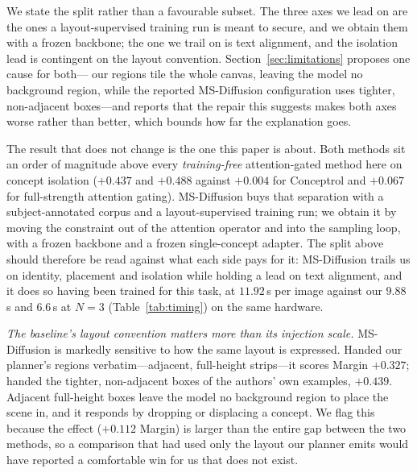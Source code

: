 \documentclass[10pt,twocolumn,letterpaper]{article}
\begin{document}
We state the split rather than a favourable subset.  The three axes we lead
on are the ones a layout-supervised training run is meant to secure, and we
obtain them with a frozen backbone; the one we trail on is text alignment,
and the isolation lead is contingent on the layout convention.
Section~\ref{sec:limitations} proposes one cause for both---
our regions tile the whole canvas, leaving the model no background region,
while the reported MS-Diffusion configuration uses tighter, non-adjacent
boxes---and reports that the repair this suggests makes both axes worse
rather than better, which bounds how far the explanation goes.

The result that does not change is the one this paper is about.  Both methods
sit an order of magnitude above every \emph{training-free} attention-gated
method here on concept isolation ($+0.437$ and $+0.488$ against $+0.004$ for
Conceptrol and $+0.067$ for full-strength attention gating).  MS-Diffusion
buys that separation with a subject-annotated corpus and a layout-supervised
training run; we obtain it by moving the constraint out of the attention
operator and into the sampling loop, with a frozen backbone and a frozen
single-concept adapter.  The split above should therefore be read against what
each side pays for it: MS-Diffusion trails us on identity, placement and
isolation while holding a lead on text alignment, and it does so having been
trained for this task, at $11.92$\,s per image against our $9.88$\,s
and $6.6$\,s at $N{=}3$ (Table~\ref{tab:timing}) on the same hardware.

\noindent\textit{The baseline's layout convention matters more than its
injection scale.}
MS-Diffusion is markedly sensitive to how the same layout is expressed.
Handed our planner's regions verbatim---adjacent, full-height strips---it
scores Margin $+0.327$; handed the tighter, non-adjacent boxes of the
authors' own examples, $+0.439$.  Adjacent full-height boxes leave the model
no background region to place the scene in, and it responds by dropping or
displacing a concept.  We flag this because the effect ($+0.112$ Margin) is
larger than the entire gap between the two methods, so a comparison that had
used only the layout our planner emits would have reported a comfortable win
for us that does not exist.
\end{document}
